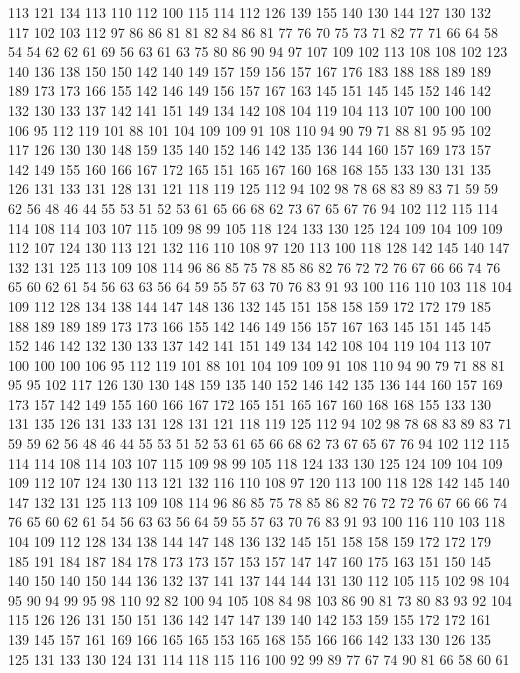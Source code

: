 113 121 134 113 110 112 100 115 114 112 126 139 155 140 130 144 127 130 132 117
102 103 112 97 86 86 81 81 82 84 86 81 77 76 70 75 73 71 82 77
71 66 64 58 54 54 62 62 61 69 56 63 61 63 75 80 86 90 94 97
107 109 102 113 108 108 102 123 140 136 138 150 150 142 140 149 157 159 156 157
167 176 183 188 188 189 189 189 173 173 166 155 142 146 149 156 157 167 163 145
151 145 145 152 146 142 132 130 133 137 142 141 151 149 134 142 108 104 119 104
113 107 100 100 100 106 95 112 119 101 88 101 104 109 109 91 108 110 94 90
79 71 88 81 95 95 102 117 126 130 130 148 159 135 140 152 146 142 135 136
144 160 157 169 173 157 142 149 155 160 166 167 172 165 151 165 167 160 168 168
155 133 130 131 135 126 131 133 131 128 131 121 118 119 125 112 94 102 98 78
68 83 89 83 71 59 59 62 56 48 46 44 55 53 51 52 53 61 65 66
68 62 73 67 65 67 76 94 102 112 115 114 114 108 114 103 107 115 109 98
99 105 118 124 133 130 125 124 109 104 109 109 112 107 124 130 113 121 132 116
110 108 97 120 113 100 118 128 142 145 140 147 132 131 125 113 109 108 114 96
86 85 75 78 85 86 82 76 72 72 76 67 66 66 74 76 65 60 62 61
54 56 63 63 56 64 59 55 57 63 70 76 83 91 93 100 116 110 103 118
104 109 112 128 134 138 144 147 148 136 132 145 151 158 158 159 172 172 179 185
188 189 189 189 173 173 166 155 142 146 149 156 157 167 163 145 151 145 145 152
146 142 132 130 133 137 142 141 151 149 134 142 108 104 119 104 113 107 100 100
100 106 95 112 119 101 88 101 104 109 109 91 108 110 94 90 79 71 88 81
95 95 102 117 126 130 130 148 159 135 140 152 146 142 135 136 144 160 157 169
173 157 142 149 155 160 166 167 172 165 151 165 167 160 168 168 155 133 130 131
135 126 131 133 131 128 131 121 118 119 125 112 94 102 98 78 68 83 89 83
71 59 59 62 56 48 46 44 55 53 51 52 53 61 65 66 68 62 73 67
65 67 76 94 102 112 115 114 114 108 114 103 107 115 109 98 99 105 118 124
133 130 125 124 109 104 109 109 112 107 124 130 113 121 132 116 110 108 97 120
113 100 118 128 142 145 140 147 132 131 125 113 109 108 114 96 86 85 75 78
85 86 82 76 72 72 76 67 66 66 74 76 65 60 62 61 54 56 63 63
56 64 59 55 57 63 70 76 83 91 93 100 116 110 103 118 104 109 112 128
134 138 144 147 148 136 132 145 151 158 158 159 172 172 179 185 191 184 187 184
178 173 173 157 153 157 147 147 160 175 163 151 150 145 140 150 140 150 144 136
132 137 141 137 144 144 131 130 112 105 115 102 98 104 95 90 94 99 95 98
110 92 82 100 94 105 108 84 98 103 86 90 81 73 80 83 93 92 104 115
126 126 131 150 151 136 142 147 147 139 140 142 153 159 155 172 172 161 139 145
157 161 169 166 165 165 153 165 168 155 166 166 142 133 130 126 135 125 131 133
130 124 131 114 118 115 116 100 92 99 89 77 67 74 90 81 66 58 60 61
